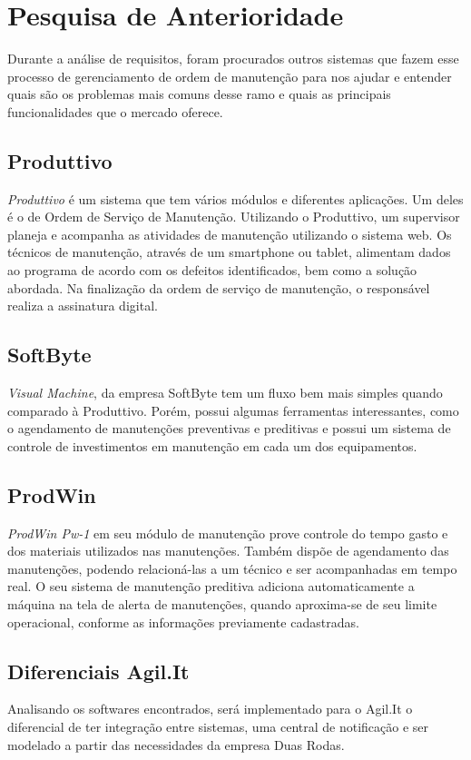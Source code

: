 \chapter{Pesquisa de Anterioridade}
Durante a análise de requisitos, foram procurados outros sistemas que fazem esse processo de gerenciamento de ordem de manutenção para nos ajudar e entender quais são os problemas mais comuns desse ramo e quais as principais funcionalidades que o mercado oferece.

\section{Produttivo}

\textit{Produttivo} é um sistema que tem vários módulos e diferentes aplicações. Um deles é o de Ordem de Serviço de Manutenção.
Utilizando o Produttivo, um supervisor planeja e acompanha as atividades de manutenção utilizando o sistema web. Os técnicos de manutenção, através de um smartphone ou tablet, alimentam dados ao programa de acordo com os defeitos identificados, bem como a solução abordada. Na finalização da ordem de serviço de manutenção, o responsável realiza a assinatura digital. \cite{produttivo}


\section{SoftByte}
\textit{Visual Machine}, da empresa SoftByte tem um fluxo bem mais simples quando comparado à Produttivo. Porém, possui algumas ferramentas interessantes, como o agendamento de manutenções preventivas e preditivas e possui um sistema de controle de investimentos em manutenção em cada um dos equipamentos. \cite{softbyte}


\section{ProdWin}
\textit{ProdWin Pw-1} em seu módulo de manutenção prove controle do tempo gasto e dos materiais utilizados nas manutenções. Também dispõe de agendamento das manutenções, podendo relacioná-las a um técnico e ser acompanhadas em tempo real. O seu sistema de manutenção preditiva adiciona automaticamente a máquina na tela de alerta de manutenções, quando aproxima-se de seu limite operacional, conforme as informações previamente cadastradas. \cite{prodwin}

\section{Diferenciais Agil.It}
Analisando os softwares encontrados, será implementado para o Agil.It o diferencial de ter integração entre sistemas, uma central de notificação e ser modelado a partir das necessidades da empresa Duas Rodas.